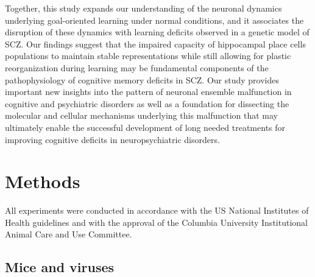 Together, this study expands our understanding of the neuronal dynamics underlying goal-oriented learning under normal conditions, and it associates the disruption of these dynamics with learning deficits observed in a genetic model of SCZ. Our findings suggest that the impaired capacity of hippocampal place cells populations to maintain stable representations while still allowing for plastic reorganization during learning may be fundamental components of the pathophysiology of cognitive memory deficits in SCZ. Our study provides important new insights into the pattern of neuronal ensemble malfunction in cognitive and psychiatric disorders as well as a foundation for dissecting the molecular and cellular mechanisms underlying this malfunction that may ultimately enable the successful development of long needed treatments for improving cognitive deficits in neuropsychiatric disorders.

\section{Methods}

All experiments were conducted in accordance with the US National Institutes of Health guidelines and with the approval of the Columbia University Institutional Animal Care and Use Committee.

\subsection{Mice and viruses}
\label{sec:df:methods:mice}

